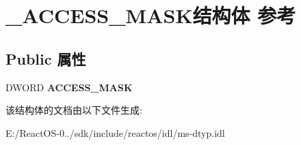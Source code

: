 \hypertarget{struct___a_c_c_e_s_s___m_a_s_k}{}\section{\+\_\+\+A\+C\+C\+E\+S\+S\+\_\+\+M\+A\+S\+K结构体 参考}
\label{struct___a_c_c_e_s_s___m_a_s_k}
\subsection*{Public 属性}
\begin{DoxyCompactItemize}
\item 
\mbox{\label{struct___a_c_c_e_s_s___m_a_s_k_a60fe5d16e02258f7c575d0a75b0b7c43}} 
D\+W\+O\+RD {\bfseries A\+C\+C\+E\+S\+S\+\_\+\+M\+A\+SK}
\end{DoxyCompactItemize}


该结构体的文档由以下文件生成\+:\begin{DoxyCompactItemize}
\item 
E\+:/\+React\+O\+S-\/0../sdk/include/reactos/idl/ms-\/dtyp.\+idl\end{DoxyCompactItemize}

